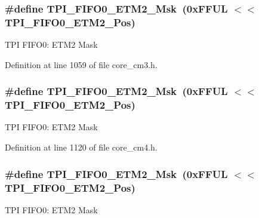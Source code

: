 \subsubsection[{\texorpdfstring{T\+P\+I\+\_\+\+F\+I\+F\+O0\+\_\+\+E\+T\+M2\+\_\+\+Msk}{TPI_FIFO0_ETM2_Msk}}]{\setlength{\rightskip}{0pt plus 5cm}\#define T\+P\+I\+\_\+\+F\+I\+F\+O0\+\_\+\+E\+T\+M2\+\_\+\+Msk~(0x\+F\+F\+U\+L $<$$<$ T\+P\+I\+\_\+\+F\+I\+F\+O0\+\_\+\+E\+T\+M2\+\_\+\+Pos)}\hypertarget{group___c_m_s_i_s___t_p_i_gaa82a7b9b99c990fb12eafb3c84b68254}{}\label{group___c_m_s_i_s___t_p_i_gaa82a7b9b99c990fb12eafb3c84b68254}
T\+PI F\+I\+F\+O0\+: E\+T\+M2 Mask 

Definition at line 1059 of file core\+\_\+cm3.\+h.

\subsubsection[{\texorpdfstring{T\+P\+I\+\_\+\+F\+I\+F\+O0\+\_\+\+E\+T\+M2\+\_\+\+Msk}{TPI_FIFO0_ETM2_Msk}}]{\setlength{\rightskip}{0pt plus 5cm}\#define T\+P\+I\+\_\+\+F\+I\+F\+O0\+\_\+\+E\+T\+M2\+\_\+\+Msk~(0x\+F\+F\+U\+L $<$$<$ T\+P\+I\+\_\+\+F\+I\+F\+O0\+\_\+\+E\+T\+M2\+\_\+\+Pos)}\hypertarget{group___c_m_s_i_s___t_p_i_gaa82a7b9b99c990fb12eafb3c84b68254}{}\label{group___c_m_s_i_s___t_p_i_gaa82a7b9b99c990fb12eafb3c84b68254}
T\+PI F\+I\+F\+O0\+: E\+T\+M2 Mask 

Definition at line 1120 of file core\+\_\+cm4.\+h.

\subsubsection[{\texorpdfstring{T\+P\+I\+\_\+\+F\+I\+F\+O0\+\_\+\+E\+T\+M2\+\_\+\+Msk}{TPI_FIFO0_ETM2_Msk}}]{\setlength{\rightskip}{0pt plus 5cm}\#define T\+P\+I\+\_\+\+F\+I\+F\+O0\+\_\+\+E\+T\+M2\+\_\+\+Msk~(0x\+F\+F\+U\+L $<$$<$ T\+P\+I\+\_\+\+F\+I\+F\+O0\+\_\+\+E\+T\+M2\+\_\+\+Pos)}\hypertarget{group___c_m_s_i_s___t_p_i_gaa82a7b9b99c990fb12eafb3c84b68254}{}\label{group___c_m_s_i_s___t_p_i_gaa82a7b9b99c990fb12eafb3c84b68254}
T\+PI F\+I\+F\+O0\+: E\+T\+M2 Mask 

